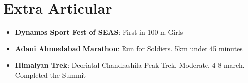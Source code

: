 \documentclass[letterpaper,11pt]{article}
\newcommand{\resumeItem}[2]{
  \item\small{
    \textbf{#1}{: #2 \vspace{-2pt}}
  }
}
\newcommand{\resumeSubItem}[2]{\resumeItem{#1}{#2}\vspace{-4pt}}
\newcommand{\resumeSubHeadingListStart}{\begin{itemize}[leftmargin=*]}
\newcommand{\resumeSubHeadingListEnd}{\end{itemize}}
\begin{document}
\section{Extra Articular}
  \resumeSubHeadingListStart
    \resumeSubItem{Dynamos Sport Fest of SEAS}
      {First in 100 m Girls}
    \resumeSubItem{Adani Ahmedabad Marathon}
      {Run for Soldiers. 5km under 45 minutes}
    \resumeSubItem{Himalyan Trek}
      {Deoriatal Chandrashila Peak Trek. Moderate. 4-8 march. Completed the Summit}
  \resumeSubHeadingListEnd


%


\end{document}
